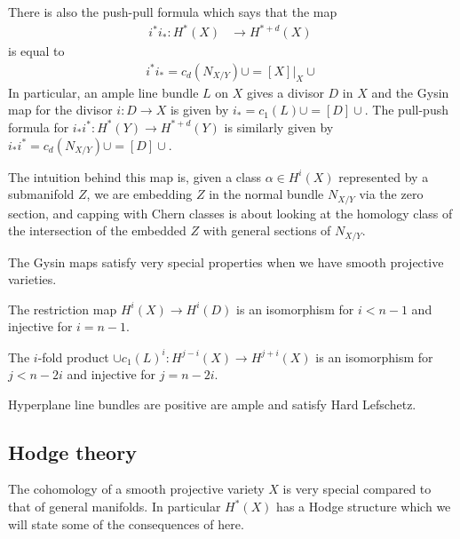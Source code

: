 \documentclass[12pt]{article}
\begin{document}
There is also the push-pull formula which says that the map \begin{align*}
    i^*i_*:H^*(X) & \to H^{*+d}(X)\
\end{align*} is equal to \begin{align*}
    i^*i_* = c_d(N_{X/Y})\cup = [X]\vert_X\cup
\end{align*} In particular, an ample line bundle $L$ on $X$ gives a divisor $D$ in $X$ and
the Gysin map for the divisor $i:D\to X$ is given by $i_* = c_1(L)\cup = [D] \cup$.
The pull-push formula for $i_*i^*: H^*(Y) \to H^{*+d}(Y)$ is similarly
given by $i_*i^* = c_d(N_{X/Y})\cup = [D]\cup$.

\begin{remark}
    The intuition behind this map is, given a class $\alpha \in H^i(X)$ represented by
    a submanifold $Z$, we are embedding $Z$ in the normal bundle $N_{X/Y}$ via the zero section,
    and capping with Chern classes is about looking at the homology class of
    the intersection of the embedded $Z$ with general sections of $N_{X/Y}$.
\end{remark}
The Gysin maps satisfy very special properties when we have smooth projective varieties.
\begin{theorem}
     The restriction map $H^i(X)\to H^i(D)$ is an isomorphism for
    $i < n-1$ and injective for $i = n-1$.
\end{theorem}

\begin{theorem}
    The $i$-fold product $\cup c_1(L)^i:H^{j-i}(X)\to H^{j+i}(X)$ is
    an isomorphism for $j < n-2i$ and injective for $j = n-2i$.
\end{theorem}

\begin{remark}
    Hyperplane line bundles are positive are ample and satisfy Hard Lefschetz.
\end{remark}
\subsection{Hodge theory}
The cohomology of a smooth projective variety $X$ is very special
compared to that of general manifolds. In particular $H^*(X)$ has a Hodge structure
which we will state some of the consequences of here.
\end{document}
